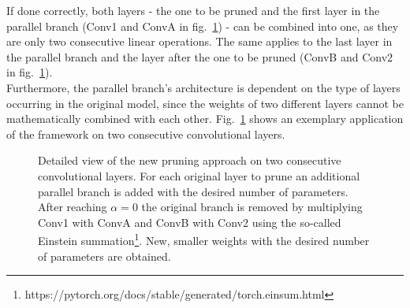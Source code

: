 \documentclass[10pt,twocolumn,letterpaper]{article}
\begin{document}
If done correctly, both layers - the one to be pruned and the first layer in the parallel branch (Conv1 and ConvA in fig.~\ref{fig:new_approach_detail}) - can be combined into one, as they are only two consecutive linear operations.
The same applies to the last layer in the parallel branch and the layer after the one to be pruned (ConvB and Conv2 in fig.~\ref{fig:new_approach_detail}).\\
Furthermore, the parallel branch's architecture is dependent on the type of layers occurring in the original model, since the weights of two different layers cannot be mathematically combined with each other.
Fig.~\ref{fig:new_approach_detail} shows an exemplary application of the framework on two consecutive convolutional layers.
\begin{figure}[!h]
	\centering
	\hspace{10pt}
	\hspace{10pt}
	\caption[]{Detailed view of the new pruning approach on two consecutive convolutional layers.
		For each original layer to prune an additional parallel branch is added with the desired number of parameters.
		After reaching $\alpha=0$ the original branch is removed by multiplying Conv1 with ConvA and ConvB with Conv2 using the so-called Einstein summation\footnote{https://pytorch.org/docs/stable/generated/torch.einsum.html}.
		New, smaller weights with the desired number of parameters are obtained.
	}
	\label{fig:new_approach_detail}
\end{figure}
\end{document}
